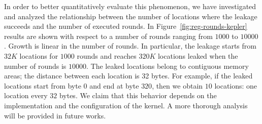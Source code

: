\documentclass[11pt,onecolumn,letterpaper]{IEEEtran}
\begin{document}
In order to better quantitatively evaluate this phenomenon, 
we have investigated and analyzed the relationship between the number of locations where the leakage succeeds and the number of executed rounds.
In Figure~\ref{fig:reg-rounds-kepler} results are shown with respect to a number of rounds ranging from $1000$ to $10000$.
Growth is linear in the number of rounds.
In particular, the leakage starts from $32K$ locations for $1000$ rounds  and reaches $320K$ locations leaked when the number of rounds is $10000$.
The leaked locations belong to contiguous memory areas; the distance between each location is 32 bytes.
For example, if the leaked locations start from byte $0$ and end at byte $320$, then we obtain $10$ locations: one location every $32$ bytes.
We claim that this behavior depends on the implementation and the configuration of the kernel.
A more thorough analysis will be provided in future works.
\end{document}
